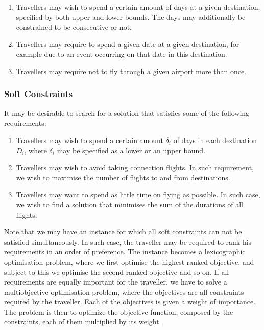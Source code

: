 \documentclass{mpaper}
\begin{document}
\begin{enumerate}
\item Travellers may wish to spend a certain amount of days at a given destination, specified by both upper and lower bounds. The days may additionally be constrained to be consecutive or not.

\item Travellers may require to spend a given date at a given destination, for example due to an event occurring on that date in this destination.

\item Travellers may require not to fly through a given airport more than once.
\end{enumerate}

\subsubsection{Soft Constraints}
\label{subsec:softconstraints}
It may be desirable to search for a solution that satisfies some of the following requirements:

\begin{enumerate}
\item Travellers may wish to spend a certain amount $\delta_{i}$ of days in each destination $D_{i}$, where $\delta_{i}$ may be specified as a lower or an upper bound.

\item Travellers may wish to avoid taking connection flights. In such requirement, we wish to maximise the number of flights to and from destinations.

\item Travellers may want to spend as little time on flying as possible. In such case, we wish to find a solution that minimises the sum of the durations of all flights.
\end{enumerate}

Note that we may have an instance for which all soft constraints can not be satisfied simultaneously. In such case, the traveller may be required to rank his requirements in an order of preference. The instance becomes a lexicographic optimisation problem, where we first optimise the highest ranked objective, and subject to this we optimise the second ranked objective and so on.
If all requirements are equally important for the traveller, we have to solve a multiobjective optimisation problem, where the objectives are all constraints required by the traveller. Each of the objectives is given a weight of importance. The problem is then to optimize the objective function, composed by the constraints, each of them multiplied by its weight. %
\end{document}
